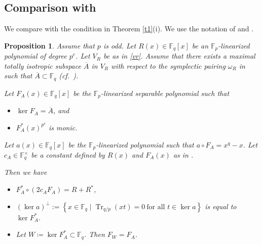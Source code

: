 \documentclass[12pt,a4paper]{amsart}
\newtheorem{proposition}[theorem]{Proposition}
\theoremstyle{definition}
\def\F{{\mathbb F}}
\theoremstyle{remark}
\DeclareMathOperator{\Tr}{Tr}
\begin{document}
\subsection{Comparison with \cite[Condition 4.6]{ITT}}\label{ssec: Comparison with ITT}
We compare \cite[Condition 4.6]{ITT} with the condition in Theorem \ref{t1}(i). 
We use the notation of \cite{ITT} and \cite{TT}. 
\begin{proposition}\label{4.6pre}
Assume that $p$ is odd. 
Let $R(x) \in \F_q[x]$ be an $\F_p$-linearized polynomial of degree $p^e$. Let $V_R$ be as in \eqref{vr}. 
Assume that there exists a maximal totally isotropic subspace $\overline{A}$ in $V_R$ with respect to the symplectic pairing $\omega_R$ in \cite[Lemma 2.3(3)]{TT} such that $\overline{A} \subset \F_q$ (cf.\ \cite[(2.2) and Lemma 2.6]{TT}). 

Let $F_A(x) \in \F_q[x]$ be the $\F_p$-linearized separable polynomial such that 
\begin{itemize}
\item $\ker F_A = \overline{A}$, and 
\item $F_A^\ast(x)^{p^e}$ is monic.  
\end{itemize}
Let $a(x) \in \F_q[x]$ be the $\F_p$-linearized polynomial such that $a \circ F_A = x^q - x$. 
Let $c_A \in \F_q^{\times}$ be a constant defined by 
$R(x)$ and $F_A(x)$ as in \cite[(3.4)]{ITT}. 

Then we have 
\begin{itemize}
\item[{\rm (i)}] $F_A^\ast \circ (2c_A F_A)=R+R^\ast$, 
\item[{\rm (ii)}] $(\ker a)^{\perp} := \left\{x \in \F_q \mid \Tr_{q/p}(xt)=0 \ \text{for all } t \in \ker a\right\}$ is equal to $\ker F_A^\ast$. 
\item[{\rm (iii)}] Let $W\coloneqq \ker F_A^{\ast} \subset \F_q$. Then 
$F_W=F_A$. 
\end{itemize}
\end{proposition}
\end{document}
